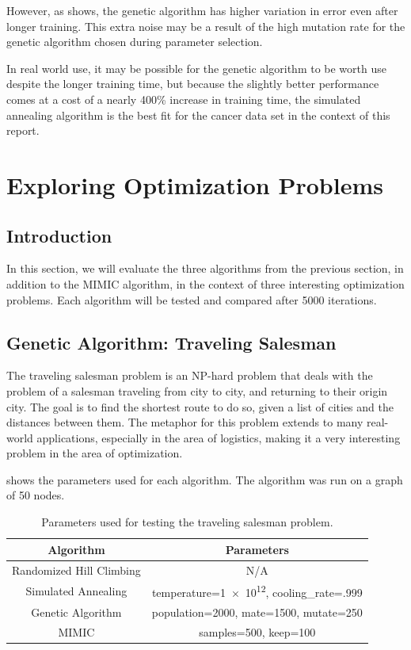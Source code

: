 \documentclass{article}
\begin{document}
      However, as  shows, the genetic algorithm has higher variation in error even after longer training. This extra noise may be a result of the high mutation rate for the genetic algorithm chosen during parameter selection.

      In real world use, it may be possible for the genetic algorithm to be worth use despite the longer training time, but because the slightly better performance comes at a cost of a nearly 400\% increase in training time, the simulated annealing algorithm is the best fit for the cancer data set in the context of this report.

  \section{Exploring Optimization Problems}

    \subsection{Introduction}
      In this section, we will evaluate the three algorithms from the previous section, in addition to the MIMIC algorithm, in the context of three interesting optimization problems. Each algorithm will be tested and compared after 5000 iterations.

    \subsection{Genetic Algorithm: Traveling Salesman}
      The traveling salesman problem is an NP-hard problem that deals with the problem of a salesman traveling from city to city, and returning to their origin city. The goal is to find the shortest route to do so, given a list of cities and the distances between them. The metaphor for this problem extends to many real-world applications, especially in the area of logistics, making it a very interesting problem in the area of optimization.

       shows the parameters used for each algorithm. The algorithm was run on a graph of 50 nodes.

      \begin{table}[h!]
      \centering
        \begin{tabular}{||c|c||}\hline
          \textbf{Algorithm} & \textbf{Parameters} \\ \hline
          Randomized Hill Climbing & N/A \\ \hline
          Simulated Annealing & temperature=\num{1e12}, cooling\_rate=.999 \\ \hline
          Genetic Algorithm & population=2000, mate=1500, mutate=250 \\ \hline
          MIMIC & samples=500, keep=100 \\ \hline
        \end{tabular}

        \caption{Parameters used for testing the traveling salesman problem.}
        \label{tab:ts-params}
      \end{table}
\end{document}
